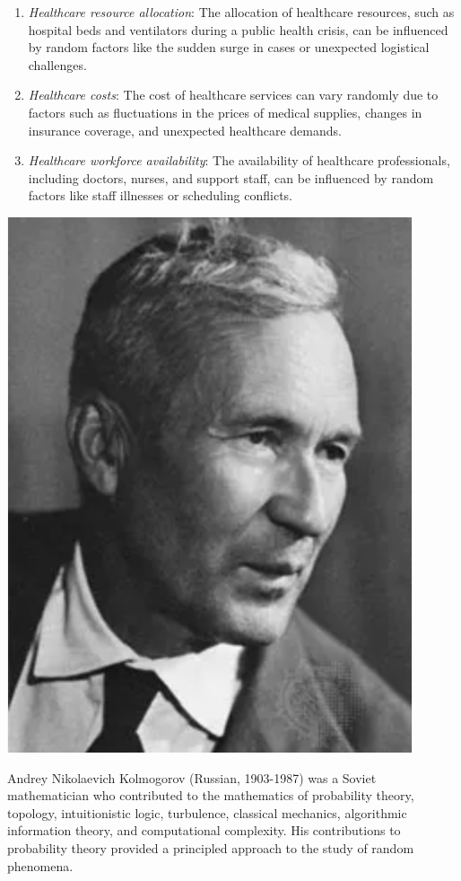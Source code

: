 \documentclass{tufte-handout}
\begin{document}
\begin{enumerate}
\item \textit{Healthcare resource allocation}: The allocation of healthcare resources, such as hospital beds and ventilators during a public health crisis, can be influenced by random factors like the sudden surge in cases or unexpected logistical challenges.

\item \textit{Healthcare costs}: The cost of healthcare services can vary randomly due to factors such as fluctuations in the prices of medical supplies, changes in insurance coverage, and unexpected healthcare demands.

\item  \textit{Healthcare workforce availability}: The availability of healthcare professionals, including doctors, nurses, and support staff, can be influenced by random factors like staff illnesses or scheduling conflicts.
\end{enumerate}

\begin{marginfigure}
\includegraphics{fig/Kolmogorov.png}
\caption{Andrey Nikolaevich Kolmogorov (Russian, 1903-1987) was a Soviet mathematician who contributed to the mathematics of probability theory, topology, intuitionistic logic, turbulence, classical mechanics, algorithmic information theory, and computational complexity. His contributions to probability theory
provided a principled approach to the study of random phenomena. }
\end{marginfigure}
\end{document}

